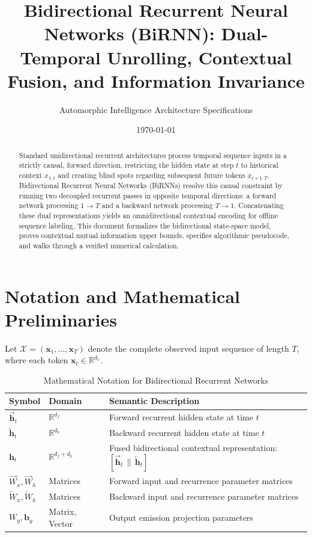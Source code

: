 \documentclass[11pt,a4paper]{article}
\title{Bidirectional Recurrent Neural Networks (BiRNN): Dual-Temporal Unrolling, Contextual Fusion, and Information Invariance}
\author{Automorphic Intelligence Architecture Specifications}
\date{\today}
\theoremstyle{definition}
\begin{document}
\maketitle

\begin{abstract}
Standard unidirectional recurrent architectures process temporal sequence inputs in a strictly causal, forward direction, restricting the hidden state at step $t$ to historical context $x_{1:t}$ and creating blind spots regarding subsequent future tokens $x_{t+1:T}$. Bidirectional Recurrent Neural Networks (BiRNNs) resolve this causal constraint by running two decoupled recurrent passes in opposite temporal directions: a forward network processing $1 \to T$ and a backward network processing $T \to 1$. Concatenating these dual representations yields an omnidirectional contextual encoding for offline sequence labeling. This document formalizes the bidirectional state-space model, proves contextual mutual information upper bounds, specifies algorithmic pseudocode, and walks through a verified numerical calculation.
\end{abstract}

\section{Notation and Mathematical Preliminaries}

Let $\mathcal{X} = (\mathbf{x}_1, \dots, \mathbf{x}_T)$ denote the complete observed input sequence of length $T$, where each token $\mathbf{x}_t \in \mathbb{R}^{d_x}$.

\begin{table}[h]
\centering
\caption{Mathematical Notation for Bidirectional Recurrent Networks}
\begin{tabular}{lll}
\toprule
\textbf{Symbol} & \textbf{Domain} & \textbf{Semantic Description} \\
\midrule
$\overrightarrow{\mathbf{h}}_t$ & $\mathbb{R}^{d_f}$ & Forward recurrent hidden state at time $t$ \\
$\overleftarrow{\mathbf{h}}_t$ & $\mathbb{R}^{d_b}$ & Backward recurrent hidden state at time $t$ \\
$\mathbf{h}_t$ & $\mathbb{R}^{d_f + d_b}$ & Fused bidirectional contextual representation: $[\overrightarrow{\mathbf{h}}_t \,\|\, \overleftarrow{\mathbf{h}}_t]$ \\
$\overrightarrow{W}_x, \overrightarrow{W}_h$ & Matrices & Forward input and recurrence parameter matrices \\
$\overleftarrow{W}_x, \overleftarrow{W}_h$ & Matrices & Backward input and recurrence parameter matrices \\
$W_y, \mathbf{b}_y$ & Matrix, Vector & Output emission projection parameters \\
\bottomrule
\end{tabular}
\end{table}
\end{document}
